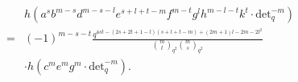 \documentclass[table,a4paper,reqno]{amsart}
\numberwithin{equation}{section}
\theoremstyle{definition}
\begin{document}
\begin{equation}\label{eq:4.69}
    \begin{split}
        &h\left(a^{s}b^{m-s}d^{m-s-l}e^{s+l+t-m}f^{m-t}g^{l}h^{m-l-t}k^{t}\cdot\text{det}_q^{-m}\right)\\
        =&(-1)^{m-s-t}
        \frac{q^{4st-(2s+2t+1-l)(s+l+t-m)+(2m+1)l-2m-2l^2}}{{m\choose t}_{q^2}{m\choose s}_{q^2}}\\
        &\cdot h\left(c^me^mg^m\cdot\text{det}_q^{-m}\right).
    \end{split}
\end{equation}
\end{document}
